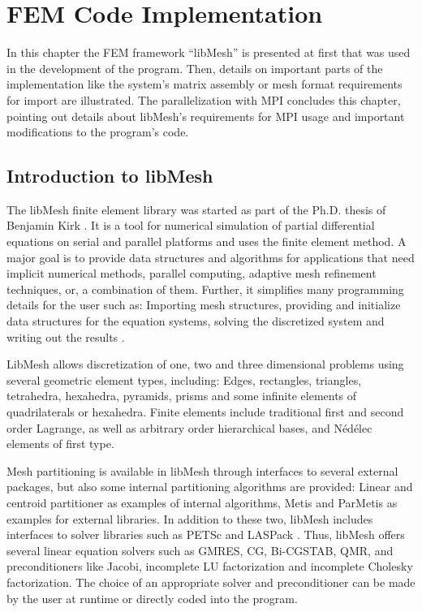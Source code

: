 \section{FEM Code Implementation}
 In this chapter the FEM framework ``libMesh'' is presented at first that was used in the development of the program. Then, details on important parts of the implementation like the system's matrix assembly or mesh format requirements for import are illustrated. The parallelization with MPI concludes this chapter, pointing out details about libMesh's requirements for MPI usage and important modifications to the program's code.
 
 
 
 \subsection{Introduction to libMesh}\label{sec:Impl-Intro}
 The libMesh finite element library was started as part of the Ph.D. thesis of Benjamin Kirk \cite{kirk2007adaptive}. It is a tool for numerical simulation of partial differential equations on serial and parallel platforms and uses the finite element method. A major goal is to provide data structures and algorithms for applications that need implicit numerical methods, parallel computing, adaptive mesh refinement techniques, or, a combination of them. Further, it simplifies many programming details for the user such as: Importing mesh structures, providing and initialize data structures for the equation systems, solving the discretized system and writing out the results \cite{kirk2013case}.
 
 LibMesh allows discretization of one, two and three dimensional problems using several geometric element types, including: Edges, rectangles, triangles, tetrahedra, hexahedra, pyramids, prisms and some infinite elements of quadrilaterals or hexahedra. Finite elements include traditional first and second order Lagrange, as well as arbitrary order hierarchical bases, and N\'{e}d\'{e}lec elements of first type.
 
 Mesh partitioning is available in libMesh through interfaces to several external packages, but also some internal partitioning algorithms are provided: Linear and centroid partitioner as examples of internal algorithms, Metis and ParMetis \cite{karypis1998fast} as examples for external libraries. In addition to these two, libMesh includes interfaces to solver libraries such as PETSc \cite{petsc2015url} and LASPack \cite{laspack2015url}. Thus, libMesh offers several linear equation solvers such as GMRES, CG, Bi-CGSTAB, QMR, and preconditioners like Jacobi, incomplete LU factorization and incomplete Cholesky factorization. The choice of an appropriate solver and preconditioner can be made by the user at runtime or directly coded into the program.
 
